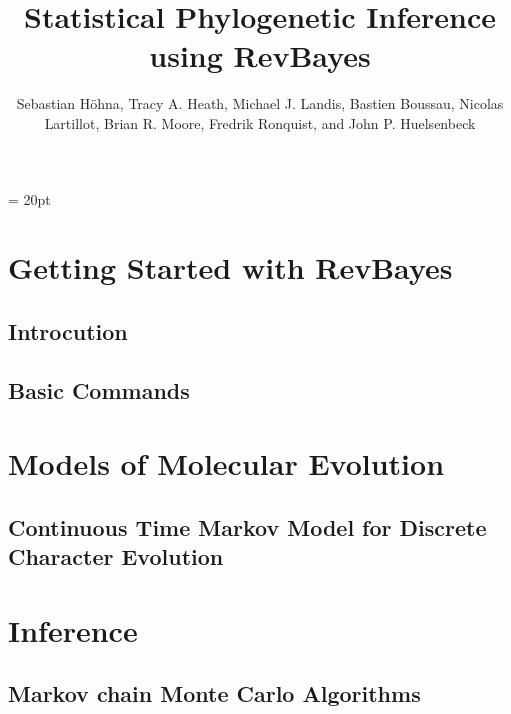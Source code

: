 \documentclass[11pt]{book}
\begin{document}
\renewcommand{\headrulewidth}{0.5pt}
\headsep = 20pt
\lhead{ }


\title{\Huge \textbf{Statistical Phylogenetic Inference using RevBayes} }
\author{
Sebastian H{\"o}hna,
Tracy A. Heath,
Michael J. Landis,
Bastien Boussau,
Nicolas Lartillot,
Brian R. Moore,
Fredrik Ronquist, and
John P. Huelsenbeck
}


\maketitle

\tableofcontents

\def \GlobalResourcePath {./}

\part{Getting Started with RevBayes}
\chapter{Introcution}
\def \ResourcePath {RB_Getting_Started/}

\chapter{Basic Commands}
\def \ResourcePath {RB_Basics_Tutorial/}



\part{Models of Molecular Evolution}
\chapter{Continuous Time Markov Model for Discrete Character Evolution}
\def \ResourcePath {RB_CTMC_Tutorial/}


\part{Inference}
\chapter{Markov chain Monte Carlo Algorithms}

\end{document}
